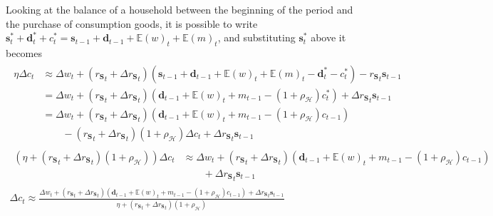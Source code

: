 \documentclass[a4paper, headings=standardclasses]{scrartcl}
\begin{document}
Looking at the balance of a household between the beginning of the period and the purchase of consumption goods, it is possible to write $\mathbf{s}^*_t + \mathbf{d}^*_t + c^*_t = \mathbf{s}_{t-1} + \mathbf{d}_{t-1} + {\mathbb{E}(w)}_t + {\mathbb{E}(m)}_t$, and substituting $\mathbf{s}^*_t$ above it becomes
\begin{gather*}
	\begin{align*}
		\eta {\Delta c}_t & \approx {\Delta w}_t   + ({r_\mathbf{S}}_t + {\Delta r_\mathbf{S}}_{t})(\mathbf{s}_{t-1} + \mathbf{d}_{t-1} + {\mathbb{E}(w)}_t + {\mathbb{E}(m)}_t - \mathbf{d}^*_t - c^*_t)- {r_\mathbf{S}}_{t} \mathbf{s}_{t-1} \\
		                  & = {\Delta w}_t         + ({r_\mathbf{S}}_t + {\Delta r_\mathbf{S}}_{t})(\mathbf{d}_{t-1} + {\mathbb{E}(w)}_t + m_{t-1} - (1+\rho_{\mathcal{H}}) c^*_t)              + {\Delta r_\mathbf{S}}_{t} \mathbf{s}_{t-1}   \\
		                  & =  {\Delta w}_t        + ({r_\mathbf{S}}_t + {\Delta r_\mathbf{S}}_{t})(\mathbf{d}_{t-1} + {\mathbb{E}(w)}_t + m_{t-1} - (1+\rho_{\mathcal{H}}) c_{t-1})                                                           \\
		                  & \qquad - ({r_\mathbf{S}}_t + {\Delta r_\mathbf{S}}_{t})(1+\rho_{\mathcal{H}}) {\Delta c}_t + {\Delta r_\mathbf{S}}_{t} \mathbf{s}_{t-1}
	\end{align*}\\
	\begin{align*}
		(\eta + ({r_\mathbf{S}}_t + {\Delta r_\mathbf{S}}_{t})(1+\rho_{\mathcal{H}})) {\Delta c}_t & \approx  {\Delta w}_t  + ({r_\mathbf{S}}_t + {\Delta r_\mathbf{S}}_{t})(\mathbf{d}_{t-1} + {\mathbb{E}(w)}_t + m_{t-1} - (1+\rho_{\mathcal{H}}) c_{t-1}) \\
		                                                                                           & \qquad + {\Delta r_\mathbf{S}}_{t} \mathbf{s}_{t-1}
	\end{align*}\\
	{\Delta c}_t \approx \frac{{\Delta w}_t + ({r_\mathbf{S}}_t + {\Delta r_\mathbf{S}}_{t})(\mathbf{d}_{t-1} + {\mathbb{E}(w)}_t + m_{t-1} - (1+\rho_{\mathcal{H}}) c_{t-1}) + {\Delta r_\mathbf{S}}_{t} \mathbf{s}_{t-1}}{\eta +  ({r_\mathbf{S}}_t + {\Delta r_\mathbf{S}}_{t})(1+\rho_{\mathcal{H}})}
\end{gather*}
\end{document}
